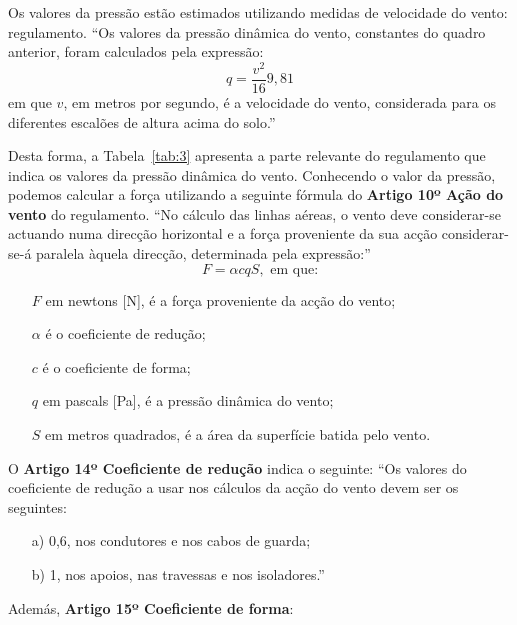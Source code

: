 Os valores da pressão estão estimados utilizando medidas de velocidade do vento: regulamento.
``Os valores da pressão dinâmica do vento, constantes do quadro
anterior, foram calculados pela expressão:
\begin{equation}
  \label{eq:6}
  q = \frac{v^2}{16}9,81
\end{equation}
em que $v$, em metros por segundo, é a velocidade do vento,
considerada para os diferentes escalões de altura acima do solo.''

Desta forma, a Tabela~\ref{tab:3} apresenta a parte relevante do regulamento que indica os valores da pressão dinâmica do vento. Conhecendo o valor da pressão, podemos calcular a força utilizando a seguinte fórmula do {\bf Artigo 10º Ação do vento} do regulamento. ``No cálculo das linhas aéreas,
o vento deve considerar-se actuando numa direcção horizontal e a força
proveniente da sua acção considerar-se-á paralela àquela direcção,
determinada pela expressão:''
\begin{equation}
  \label{eq:5}
  F = \alpha c q S, \textrm{ em que:}
\end{equation} 
\begin{itemize}[noitemsep,nolistsep]
\item[$F$] em newtons [\si{N}], é a força proveniente da acção do vento;
\item[$\alpha$] é o coeficiente de redução;
\item[$c$] é o coeficiente de forma;
\item[$q$] em pascals [\si{Pa}], é a pressão dinâmica do vento;
\item[$S$] em metros quadrados, é a área da superfície batida pelo vento.
\end{itemize}



O {\bf Artigo 14º Coeficiente de redução} indica o seguinte:
``Os valores do coeficiente de redução a usar nos cálculos da acção do vento devem ser os seguintes:
\begin{itemize}[noitemsep,nolistsep]
\item[a)] 0,6, nos condutores e nos cabos de guarda; 
\item[b)] 1, nos apoios, nas travessas e nos isoladores.''
\end{itemize}
  
Además, {\bf Artigo 15º Coeficiente de forma}:

